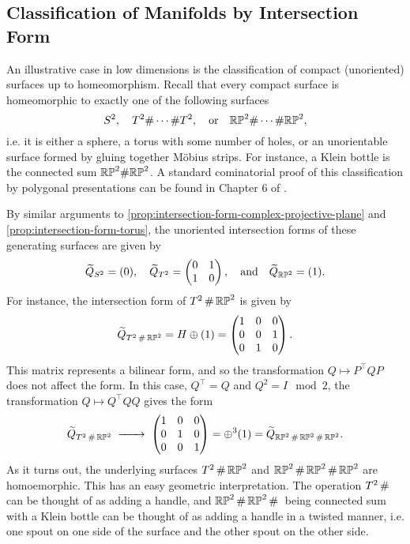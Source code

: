 \subsection{Classification of Manifolds by Intersection Form}
An illustrative case in low dimensions is the classification of compact (unoriented) surfaces up to homeomorphism. Recall that every compact surface is homeomorphic to exactly one of the following surfaces
\[
	S^2,\quad T^2\#\cdots\# T^2,\quad\textrm{or}\quad \mathbb{RP}^2\#\cdots\# \mathbb{RP}^2,
\]
i.e. it is either a sphere, a torus with some number of holes, or an unorientable surface formed by gluing together M\"obius strips. For instance, a Klein bottle is the connected sum $\mathbb{RP}^2\#\mathbb{RP}^2$.
A standard cominatorial proof of this classification by polygonal presentations can be found in Chapter 6 of \cite{lee2011topological}.

By similar arguments to \cref{prop:intersection-form-complex-projective-plane} and \cref{prop:intersection-form-torus}, the unoriented intersection forms of these generating surfaces are given by
\[
	\widetilde{Q}_{S^2}=(0),\quad \widetilde{Q}_{T^2}=\begin{pmatrix}0 & 1 \\ 1 & 0\end{pmatrix},\quad \textrm{and}\quad\widetilde{Q}_{\mathbb{RP}^2} = (1).
\]
For instance, the intersection form of $T^2\,\#\, \mathbb{RP}^2$ is given by
\[
	\widetilde{Q}_{T^2\,\#\, \mathbb{RP}^2} = H\oplus (1)=
	\begin{pmatrix}
		1 & 0 & 0 \\
		0 & 0 & 1 \\
		0 & 1 & 0
	\end{pmatrix}.
\]
This matrix represents a bilinear form, and so the transformation $Q\mapsto P^\intercal Q P$ does not affect the form. In this case, $Q^\intercal =Q$ and $Q^2=I\mod 2$, the transformation $Q\mapsto Q^\intercal Q Q$ gives the form
\[
	\widetilde{Q}_{T^2\+ \RP^2}
	\lkxto \begin{pmatrix}
		1 & 0 & 0 \\
		0 & 1 & 0 \\
		0 & 0 & 1
	\end{pmatrix} =\oplus^3(1)= \widetilde{Q}_{\RP^2\+\RP^2\+\RP^2}.
\]
As it turns out, the underlying surfaces $T^2\,\#\,\mathbb{RP}^2$ and $\mathbb{RP}^2\,\#\,\mathbb{RP}^2\,\#\,\mathbb{RP}^2$ are homoemorphic. This has an easy geometric interpretation. The operation $T^2\,\#\,$ can be thought of as adding a handle, and $\mathbb{RP}^2\,\#\,\mathbb{RP}^2\,\#\,$ being connected sum with a Klein bottle can be thought of as adding a handle in a twisted manner, i.e. one spout on one side of the surface and the other spout on the other side.

